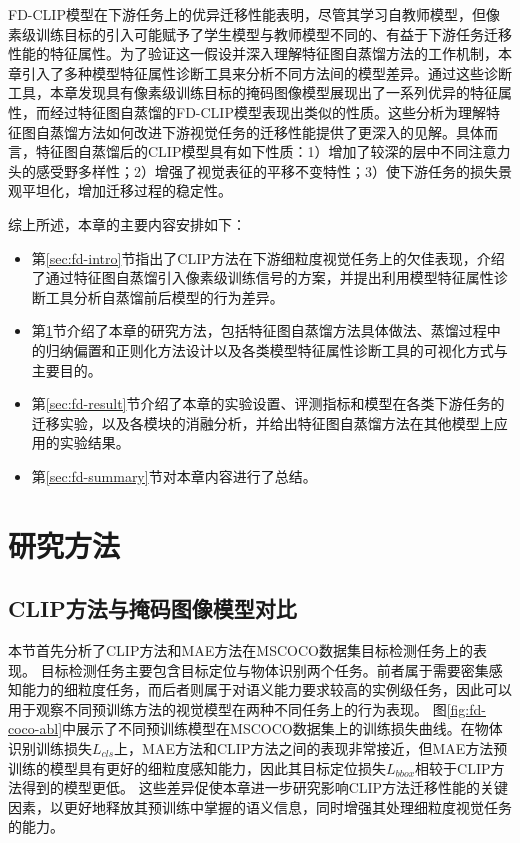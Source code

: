 FD-CLIP模型在下游任务上的优异迁移性能表明，尽管其学习自教师模型，但像素级训练目标的引入可能赋予了学生模型与教师模型不同的、有益于下游任务迁移性能的特征属性\cite{xie2023revealing}。为了验证这一假设并深入理解特征图自蒸馏方法的工作机制，本章引入了多种模型特征属性诊断工具来分析不同方法间的模型差异。通过这些诊断工具，本章发现具有像素级训练目标的掩码图像模型展现出了一系列优异的特征属性，而经过特征图自蒸馏的FD-CLIP模型表现出类似的性质。这些分析为理解特征图自蒸馏方法如何改进下游视觉任务的迁移性能提供了更深入的见解。具体而言，特征图自蒸馏后的CLIP模型具有如下性质：1）增加了较深的层中不同注意力头的感受野多样性；2）增强了视觉表征的平移不变特性；3）使下游任务的损失景观平坦化，增加迁移过程的稳定性。

综上所述，本章的主要内容安排如下：
\begin{itemize}
    \item 第\ref{sec:fd-intro}节指出了CLIP方法在下游细粒度视觉任务上的欠佳表现，介绍了通过特征图自蒸馏引入像素级训练信号的方案，并提出利用模型特征属性诊断工具分析自蒸馏前后模型的行为差异。
    \item 第\ref{sec:fd-method}节介绍了本章的研究方法，包括特征图自蒸馏方法具体做法、蒸馏过程中的归纳偏置和正则化方法设计以及各类模型特征属性诊断工具的可视化方式与主要目的。
    \item 第\ref{sec:fd-result}节介绍了本章的实验设置、评测指标和模型在各类下游任务的迁移实验，以及各模块的消融分析，并给出特征图自蒸馏方法在其他模型上应用的实验结果。
    \item 第\ref{sec:fd-summary}节对本章内容进行了总结。
\end{itemize}

\section{研究方法}
\label{sec:fd-method}

\subsection{CLIP方法与掩码图像模型对比}


本节首先分析了CLIP方法和MAE方法在MSCOCO\cite{chen2015microsoft}数据集目标检测任务上的表现。
目标检测任务主要包含目标定位与物体识别两个任务\cite{ren2016faster}。前者属于需要密集感知能力的细粒度任务，而后者则属于对语义能力要求较高的实例级任务，因此可以用于观察不同预训练方法的视觉模型在两种不同任务上的行为表现。
图\ref{fig:fd-coco-abl}中展示了不同预训练模型在MSCOCO数据集上的训练损失曲线。在物体识别训练损失$L_{cls}$上，MAE方法和CLIP方法之间的表现非常接近，但MAE方法预训练的模型具有更好的细粒度感知能力，因此其目标定位损失$L_{bbox}$相较于CLIP方法得到的模型更低。
这些差异促使本章进一步研究影响CLIP方法迁移性能的关键因素，以更好地释放其预训练中掌握的语义信息，同时增强其处理细粒度视觉任务的能力。


